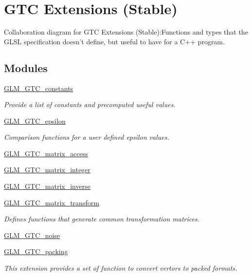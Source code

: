 \hypertarget{group__gtc}{
\section{GTC Extensions (Stable)}
\label{group__gtc}
}


Collaboration diagram for GTC Extensions (Stable):Functions and types that the GLSL specification doesn't define, but useful to have for a C++ program.  
\subsection*{Modules}
\begin{CompactItemize}
\item 
\hyperlink{group__gtc__constants}{GLM\_\-GTC\_\-constants}
\begin{CompactList}\small\item\em Provide a list of constants and precomputed useful values. \item\end{CompactList}

\item 
\hyperlink{group__gtc__epsilon}{GLM\_\-GTC\_\-epsilon}
\begin{CompactList}\small\item\em Comparison functions for a user defined epsilon values. \item\end{CompactList}

\item 
\hyperlink{group__gtc__matrix__access}{GLM\_\-GTC\_\-matrix\_\-access}
\item 
\hyperlink{group__gtc__matrix__integer}{GLM\_\-GTC\_\-matrix\_\-integer}
\item 
\hyperlink{group__gtc__matrix__inverse}{GLM\_\-GTC\_\-matrix\_\-inverse}
\item 
\hyperlink{group__gtc__matrix__transform}{GLM\_\-GTC\_\-matrix\_\-transform}
\begin{CompactList}\small\item\em Defines functions that generate common transformation matrices. \item\end{CompactList}

\item 
\hyperlink{group__gtc__noise}{GLM\_\-GTC\_\-noise}
\item 
\hyperlink{group__gtc__packing}{GLM\_\-GTC\_\-packing}
\begin{CompactList}\small\item\em This extension provides a set of function to convert vertors to packed formats. \item\end{CompactList}


\end{CompactItemize}

